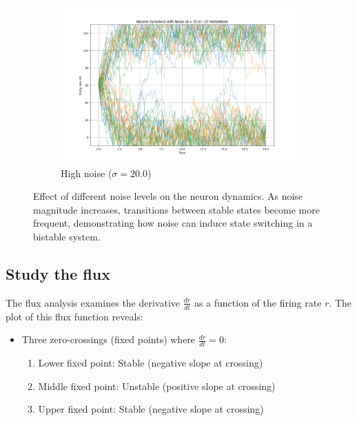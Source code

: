 \documentclass{article}
\begin{document}
\begin{figure}[H]
    \vspace{0.3cm}
    \begin{subfigure}[b]{0.48\textwidth}
        \includegraphics[width=\textwidth]{noise_strength_20.0.png}
        \caption{High noise ($\sigma = 20.0$)}
        \label{fig:noise_high}
    \end{subfigure}
    \caption{Effect of different noise levels on the neuron dynamics. As noise magnitude increases, transitions between stable states become more frequent, demonstrating how noise can induce state switching in a bistable system.}
    \label{fig:noise_effects}
\end{figure}


\subsection{Study the flux}


The flux analysis examines the derivative $\frac{dr}{dt}$ as a function of the firing rate $r$. The plot of this flux function reveals:

\begin{itemize}
    \item Three zero-crossings (fixed points) where $\frac{dr}{dt} = 0$:
    \begin{enumerate}
        \item Lower fixed point: Stable (negative slope at crossing)
        \item Middle fixed point: Unstable (positive slope at crossing)
        \item Upper fixed point: Stable (negative slope at crossing)
    \end{enumerate}
\end{itemize}
\end{document}
